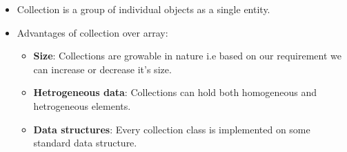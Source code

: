 \setlength{\columnsep}{3pt}
\begin{flushleft}
	
	
	\begin{itemize}
		\item Collection is a group of individual objects as a single entity.
		
		
		\item Advantages of collection over array:
		
		\begin{itemize}
			\item \textbf{Size}: Collections are growable in nature i.e based on our requirement we can increase or decrease it's size.
			\item \textbf{Hetrogeneous data}: Collections can hold both homogeneous and hetrogeneous elements.
			\item \textbf{Data structures}: Every collection class is implemented on some standard data structure.
		\end{itemize}
		
	\end{itemize}
	
	
\end{flushleft}

\newpage

